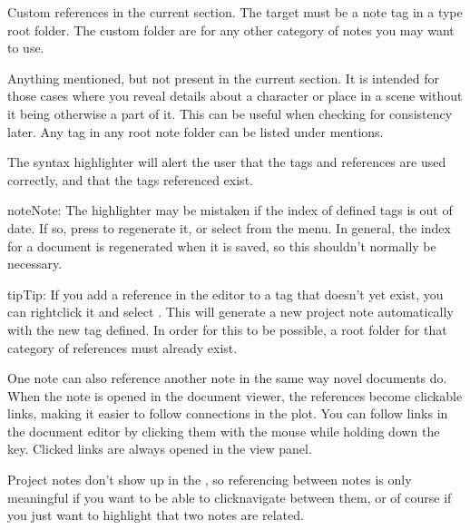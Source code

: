 \documentclass[a4paper,11pt,english]{sphinxmanual}
\begin{document}
\begin{description}
\sphinxAtStartPar
Custom references in the current section. The target must be a note tag in a  type
root folder. The custom folder are for any other category of notes you may want to use.

\sphinxAtStartPar
Anything mentioned, but not present in the current section. It is intended for those cases where
you reveal details about a character or place in a scene without it being otherwise a part of
it. This can be useful when checking for consistency later. Any tag in any root note folder can
be listed under mentions.

\end{description}

\sphinxAtStartPar
The syntax highlighter will alert the user that the tags and references are used correctly, and
that the tags referenced exist.

\begin{sphinxadmonition}{note}{Note:}
\sphinxAtStartPar
The highlighter may be mistaken if the index of defined tags is out of date. If so, press
 to regenerate it, or select  from the  menu. In general, the
index for a document is regenerated when it is saved, so this shouldn’t normally be necessary.
\end{sphinxadmonition}

\begin{sphinxadmonition}{tip}{Tip:}
\sphinxAtStartPar
If you add a reference in the editor to a tag that doesn’t yet exist, you can right\sphinxhyphen{}click it and
select . This will generate a new project note automatically with the new
tag defined. In order for this to be possible, a root folder for that category of references
must already exist.
\end{sphinxadmonition}

\sphinxAtStartPar
One note can also reference another note in the same way novel documents do. When the note is
opened in the document viewer, the references become clickable links, making it easier to follow
connections in the plot. You can follow links in the document editor by clicking them with the
mouse while holding down the  key. Clicked links are always opened in the view panel.

\sphinxAtStartPar
Project notes don’t show up in the , so referencing between notes is only
meaningful if you want to be able to click\sphinxhyphen{}navigate between them, or of course if you just want to
highlight that two notes are related.
\end{document}
